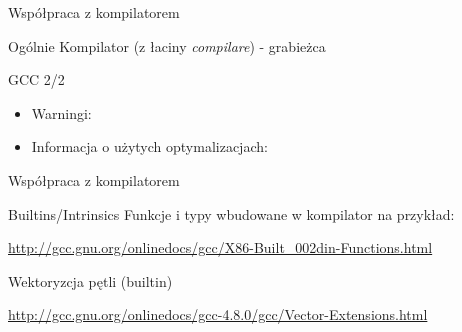 \begin{frame}[fragile]{Współpraca z kompilatorem}
	\begin{block}{Ogólnie}
	 Kompilator (z łaciny \textit{compilare}) - grabieżca %
	\end{block}
	\begin{block}{GCC 2/2}
 		\begin{itemize}
			\item Warningi:
			\begin{itemize}
			 \item \verb*%-Wall%
			 \item \verb*%-Wextra%
			 \item \verb*%-Werror%
			 \item \verb*%-pedantic%
			 \item \verb*%-Wfloat-equal% //ciekawostka
			\end{itemize}
 			\item Informacja o użytych optymalizacjach:
 			 \begin{itemize}
				\item \verb*%-fstack-usage%
				\item \verb*%-ftree-vectorizer-verbose%
				\item \verb*%-fdump-tree-{vectorize,optimize}=stderr%
				\item \verb*%-fopt-info-{optimized,vec-missed}%
			 \end{itemize}
		\end{itemize}
	\end{block}
\end{frame}
\begin{frame}[fragile]{Współpraca z kompilatorem}
	\begin{block}{Builtins/Intrinsics}
		Funkcje i typy wbudowane w kompilator na przykład:
		\begin{itemize}
			\item \verb*%__builtin_expects({G_LIKELY,G_UNLIKELY})%
			\item \verb*%__builtin_cpu_supports("sse2")%
			\item \verb*%__m64 avariable%
		\end{itemize}
		\url{http://gcc.gnu.org/onlinedocs/gcc/X86-Built_002din-Functions.html}
	\end{block}
	\begin{block}{Wektoryzcja pętli (builtin)}
		\begin{itemize}
			\item \verb*%__m64 _mm_add_pi16%
			\item \verb*%__m64 _mm_mullo_pi16%
			\item \verb*%__m64 _mm_min_ps%
		\end{itemize}
		\url{http://gcc.gnu.org/onlinedocs/gcc-4.8.0/gcc/Vector-Extensions.html}
	\end{block}
\end{frame}
